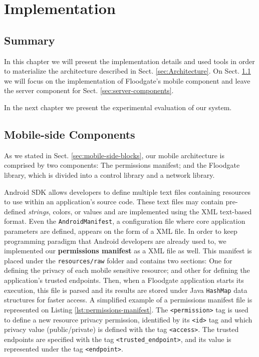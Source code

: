 \chapter{Implementation}
\label{sec:Implementation}
 
 
\section*{Summary}

In this chapter we will present the implementation details and used tools in order to materialize the architecture described in Sect. \ref{sec:Architecture}. On Sect. \ref{sec:mobile-components} we will focus on the implementation of Floodgate's mobile component and leave the server component for Sect. \ref{sec:server-components}.

In the next chapter we present the experimental evaluation of our system.

\section{Mobile-side Components}
\label{sec:mobile-components}

As we stated in Sect. \ref{sec:mobile-side-blocks}, our mobile architecture is comprised by two components: The permissions manifest; and the Floodgate library, which is divided into a control library and a network library.

Android SDK allows developers to define multiple text files containing resources to use within an application's source code. These text files may contain pre-defined \textit{strings}, colors, or values and are implemented using the XML text-based format. Even the \texttt{AndroidManifest}, a configuration file where core application parameters are defined, appears on the form of a XML file. In order to keep programming paradigm that Android developers are already used to, we implemented our \textbf{permissions manifest} as a XML file as well. This manifest is placed under the \texttt{resources/raw} folder and contains two sections: One for defining the privacy of each mobile sensitive resource; and other for defining the application's trusted endpoints. Then, when a Floodgate application starts its execution, this file is parsed and its results are stored under Java \texttt{HashMap} data structures for faster access. A simplified example of a permissions manifest file is represented on Listing \ref{lst:permissions-manifest}. The \texttt{<permission>} tag is used to define a new resource privacy permission, identified by its \texttt{<id>} tag and which privacy value (public/private) is defined with the tag \texttt{<access>}. The trusted endpoints are specified with the tag \texttt{<trusted\_endpoint>}, and its value is represented under the tag \texttt{<endpoint>}.

